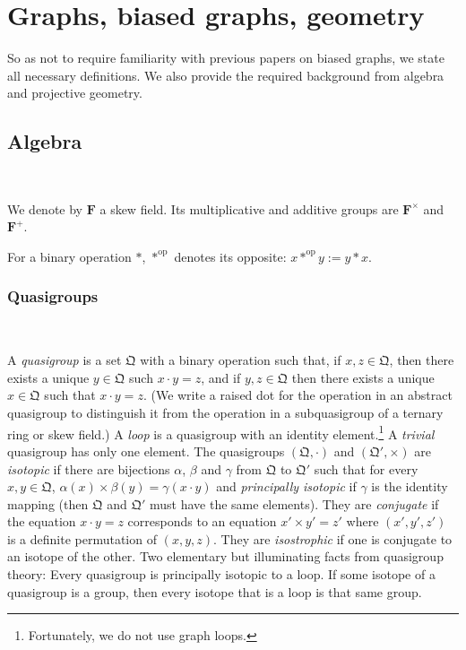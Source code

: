 \documentclass[reqno,12pt]{amsart}
\theoremstyle{remark}
\numberwithin{equation}{section}
\numberwithin{figure}{section}
\newcommand \opp{^\mathrm{op}}
\newcommand\fF{\mathbf{F}}	%
\newcommand \fQ{\mathfrak Q}
\begin{document}
\section{Graphs, biased graphs, geometry} \label{prelim}

So as not to require familiarity with previous papers on biased graphs, we state all necessary definitions.  We also provide the required background from algebra and projective geometry.


\subsection{Algebra}\label{algebra}\

We denote by $\fF$ a skew field.  Its multiplicative and additive groups are $\fF^\times$ and $\fF^+$.  

For a binary operation $*$, $*\opp$ denotes its opposite: $x *\opp y := y * x$.  

\subsubsection{Quasigroups}\label{qgps}\

A \emph{quasigroup} is a set $\fQ$ with a binary operation such that, if $x,z \in \fQ$, then there exists a unique $y \in \fQ$ such $x \cdot y = z$, and if $y,z \in \fQ$ then there exists a unique $x \in \fQ$ such that $x \cdot y = z$.    
(We write a raised dot for the operation in an abstract quasigroup to distinguish it from the operation in a subquasigroup of a ternary ring or skew field.)  
A \emph{loop} is a quasigroup with an identity element.\footnote{Fortunately, we do not use graph loops.}  
A \emph{trivial} quasigroup has only one element.  
The quasigroups $(\fQ, \cdot )$ and $(\fQ', \times)$ are \emph{isotopic} if there are bijections $\alpha$, $\beta$ and $\gamma$ from $\fQ$ to $\fQ'$ such that for every $x,y \in  \fQ$, $\alpha(x) \times \beta(y) = \gamma(x \cdot y)$ and \emph{principally isotopic} if $\gamma$ is the identity mapping (then $\fQ$ and $\fQ'$ must have the same elements).  
They are \emph{conjugate} if the equation $x \cdot y = z$ corresponds to an equation $x' \times y' = z'$ where $(x',y',z')$ is a definite permutation of $(x,y,z)$.  They are \emph{isostrophic} if one is conjugate to an isotope of the other.  
Two elementary but illuminating facts from quasigroup theory:  Every quasigroup is principally isotopic to a loop.  If some isotope of a quasigroup is a group, then every isotope that is a loop is that same group.
\end{document}
